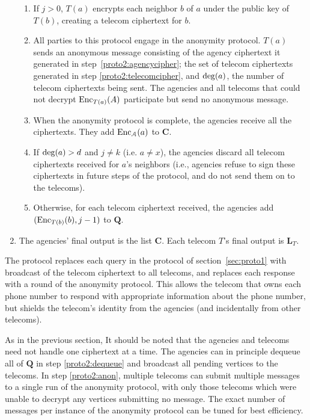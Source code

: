 \begin{enumerate}
\begin{enumerate}
\item \label{proto2:telecomcipher} If $j>0$, $T(a)$ encrypts each neighbor $b$ of $a$ under the public key of $T(b)$, creating a telecom ciphertext for $b$.

\item \label{proto2:anon} All parties to this protocol engage in the anonymity protocol. $T(a)$ sends an anonymous message consisting of the agency ciphertext it generated in step~\ref{proto2:agencycipher}; the set of telecom ciphertexts generated in step \ref{proto2:telecomcipher}, and $\operatorname{deg}(a)$, the number of telecom ciphertexts being sent. The agencies and all telecoms that could not decrypt $\operatorname{Enc}_{T(a)}(A)$ participate but send no anonymous message.

\item When the anonymity protocol is complete, the agencies receive all the ciphertexts. They add $\operatorname{Enc}_\mathcal{A}(a)$ to $\mathbf{C}$.

\item If $\operatorname{deg}(a)>d$ and $j\neq k$ (i.e. $a\neq x$), the agencies discard all telecom ciphertexts received for $a$'s neighbors (i.e., agencies refuse to sign these ciphertexts in future steps of the protocol, and do not send them on to the telecoms).

\item Otherwise, for each telecom ciphertext received, the agencies add $(\operatorname{Enc}_{T(b)}(b), j-1)$ to $\mathbf{Q}$.

\end{enumerate}

\item The agencies' final output is the list $\mathbf{C}$. Each telecom $T$'s final output is $\mathbf{L}_T$.

\end{enumerate}



The protocol replaces each query in the protocol of section~\ref{sec:proto1} with broadcast of the telecom ciphertext to all telecoms, and replaces each response with a round of the anonymity protocol. This allows the telecom that owns each phone number to respond with appropriate information about the phone number, but shields the telecom's identity from the agencies (and incidentally from other telecoms).



As in the previous section, It should be noted that the agencies and telecoms need not handle one ciphertext at a time. The agencies can in principle dequeue all of $\mathbf{Q}$ in step \ref{proto2:dequeue} and broadcast all pending vertices to the telecoms. In step \ref{proto2:anon}, multiple telecoms can submit multiple messages to a single run of the anonymity protocol, with only those telecoms which were unable to decrypt any vertices submitting no message. The exact number of messages per instance of the anonymity protocol can be tuned for best efficiency.



